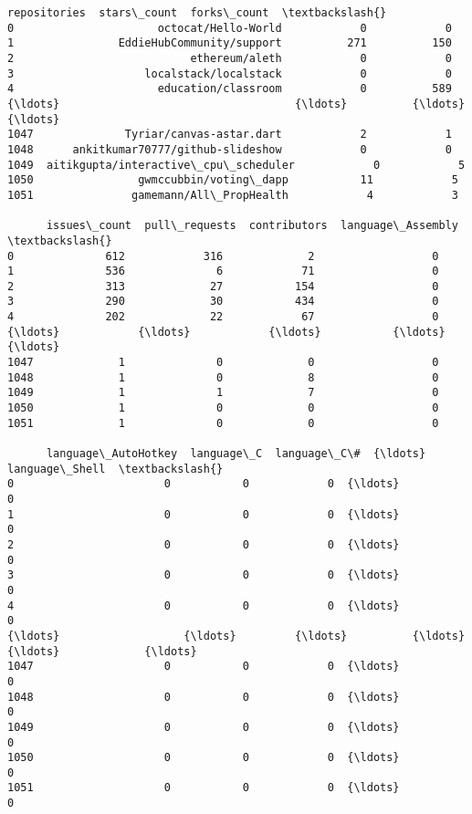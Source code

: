\documentclass[11pt]{article}
\makeatletter
\newcommand{\boxspacing}{\kern\kvtcb@left@rule\kern\kvtcb@boxsep}
\newcommand{\prompt}[4]{
        {\ttfamily\llap{{\color{#2}[#3]:\hspace{3pt}#4}}\vspace{-\baselineskip}}
    }
\makeatother
\begin{document}
            \begin{tcolorbox}[breakable, size=fbox, boxrule=.5pt, pad at break*=1mm, opacityfill=0]
\prompt{Out}{outcolor}{11}{\boxspacing}
\begin{Verbatim}[commandchars=\\\{\}]
                              repositories  stars\_count  forks\_count  \textbackslash{}
0                      octocat/Hello-World            0            0
1                EddieHubCommunity/support          271          150
2                           ethereum/aleth            0            0
3                    localstack/localstack            0            0
4                      education/classroom            0          589
{\ldots}                                    {\ldots}          {\ldots}          {\ldots}
1047              Tyriar/canvas-astar.dart            2            1
1048      ankitkumar70777/github-slideshow            0            0
1049  aitikgupta/interactive\_cpu\_scheduler            0            5
1050                gwmccubbin/voting\_dapp           11            5
1051               gamemann/All\_PropHealth            4            3

      issues\_count  pull\_requests  contributors  language\_Assembly  \textbackslash{}
0              612            316             2                  0
1              536              6            71                  0
2              313             27           154                  0
3              290             30           434                  0
4              202             22            67                  0
{\ldots}            {\ldots}            {\ldots}           {\ldots}                {\ldots}
1047             1              0             0                  0
1048             1              0             8                  0
1049             1              1             7                  0
1050             1              0             0                  0
1051             1              0             0                  0

      language\_AutoHotkey  language\_C  language\_C\#  {\ldots}  language\_Shell  \textbackslash{}
0                       0           0            0  {\ldots}               0
1                       0           0            0  {\ldots}               0
2                       0           0            0  {\ldots}               0
3                       0           0            0  {\ldots}               0
4                       0           0            0  {\ldots}               0
{\ldots}                   {\ldots}         {\ldots}          {\ldots}  {\ldots}             {\ldots}
1047                    0           0            0  {\ldots}               0
1048                    0           0            0  {\ldots}               0
1049                    0           0            0  {\ldots}               0
1050                    0           0            0  {\ldots}               0
1051                    0           0            0  {\ldots}               0


\end{Verbatim}
\end{tcolorbox}
\end{document}
